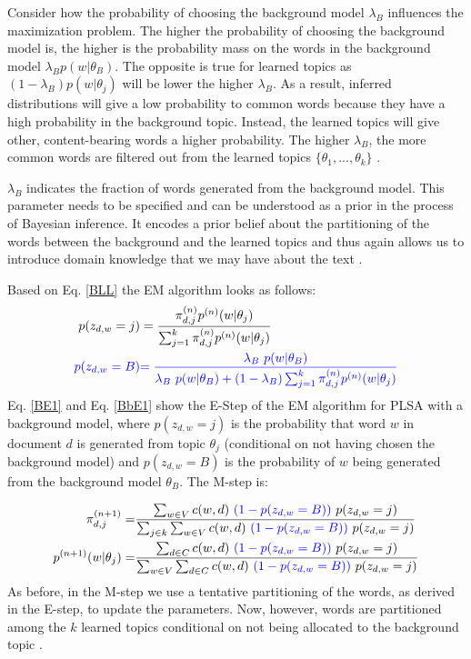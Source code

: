 \documentclass[11pt,a4paper,english,oneside]{book}
\numberwithin{equation}{chapter}
\begin{document}
Consider how the probability of choosing the background model $\lambda_B$ influences the maximization problem. The higher the probability of choosing the background model is, the higher is the probability mass on the words in the background model $\lambda_B  p(w|\theta_B)$.  The opposite is true for learned topics as $(1-\lambda_B)  p(w|\theta_j)$ will be lower the higher $\lambda_B$. As a result, inferred distributions will give a low probability to common words because they have a high probability in the background topic. Instead, the learned topics will give other, content-bearing words a higher probability. The higher $\lambda_B$, the more common words are filtered out from the learned topics $\{\theta_1, ..., \theta_k\}$ \citep[p. 352--359]{Zhai.2016}.  

$\lambda_B$ indicates the fraction of words generated from the background model. This parameter needs to be specified and can be understood as a prior in the process of Bayesian inference. It encodes a prior belief about the partitioning of the words between the background and the learned topics and thus again allows us to introduce domain knowledge that we may have about the text \citep[p. 361, 372--376]{Zhai.2016}. 

Based on Eq. \ref{BLL} the EM algorithm looks as follows:
\begin{align}\label{BE1}
p(z_{d,w}=j)&=\frac{\pi_{d,j}^{(n)}p^{(n)}(w|\theta_j)}{\sum_{j=1}^{k}\pi_{d,j}^{(n)}p^{(n)}(w|\theta_j)}\\
\label{BbE1}
\textcolor{blue}{ p(z_{d,w}=B)} & \textcolor{blue}{ =\frac{\lambda_B \ p(w|\theta_B)}{\lambda_B \ p(w|\theta_B) + (1-\lambda_B) \sum_{j=1}^{k}\pi_{d,j}^{(n)}p^{(n)}(w|\theta_j)} }
\end{align}
Eq. \ref{BE1} and Eq. \ref{BbE1} show the E-Step of the EM algorithm for PLSA with a background model, where $p(z_{d,w}=j)$ is the probability that word $w$ in document $d$ is generated from topic $\theta_j$ (conditional on not having chosen the background model) and $p(z_{d,w}=B)$ is the probability of $w$ being generated from the background model $\theta_B$. The M-step is:

\begin{align}%
\label{BM1pi} \pi_{d,j}^{(n+1)}=&\frac{\sum_{w \in V} c(w,d) \ \textcolor{blue}{(1-p(z_{d,w}=B))}\ p(z_{d,w}=j)}{\sum_{j \in k}\sum_{w \in V}c(w,d) \ \textcolor{blue}{(1-p(z_{d,w}=B))} \ p(z_{d,w}=j)}\\
\label{BM1theta} p^{(n+1)}(w|\theta_j)=&\frac{\sum_{d \in C} c(w,d) \ \textcolor{blue}{(1-p(z_{d,w}=B))} \ p(z_{d,w}=j)}{\sum_{w \in V}\sum_{d \in C}c(w,d)\ \textcolor{blue}{(1-p(z_{d,w}=B))}\ p(z_{d,w}=j)}
\end{align}
As before, in the M-step we use a tentative partitioning of the words, as derived in the E-step, to update the parameters. Now, however, words are partitioned among the $k$ learned topics conditional on not being allocated to the background topic \citep[p. 372--376]{Zhai.2016}. 
\end{document}
